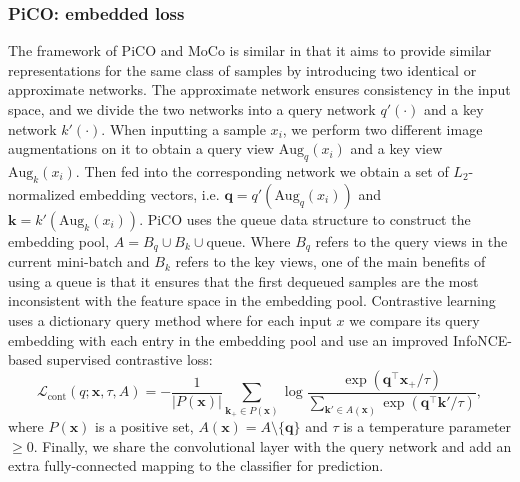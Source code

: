 \documentclass{article} %
\begin{document}
\subsubsection{PiCO: embedded loss}
The framework of PiCO and MoCo\citep{KaimingHe2019MomentumCF} is similar in that it aims to provide similar representations for the same class of samples by introducing two identical or approximate networks.
The approximate network ensures consistency in the input space, and we divide the two networks into a query network $q'(\cdot)$ and a key network $k'(\cdot)$.
When inputting a sample $x_i$, we perform two different image augmentations on it to obtain a query view $\text{Aug}_q(x_i)$ and a key view $\text{Aug}_k(x_i)$. 
Then fed into the corresponding network we obtain a set of $L_2$-normalized embedding vectors, i.e. $\boldsymbol{q} = q'(\text{Aug}_q(x_i))$ and $\boldsymbol{k} = k'(\text{Aug}_k(x_i))$.
PiCO uses the queue data structure to construct the embedding pool, $A = B_q \cup B_k \cup \text{queue}$.
Where $B_q$ refers to the query views in the current mini-batch and $B_k$ refers to the key views, one of the main benefits of using a queue is that it ensures that the first dequeued samples are the most inconsistent with the feature space in the embedding pool. 
Contrastive learning uses a dictionary query method where for each input $x$ we compare its query embedding with each entry in the embedding pool and use an improved InfoNCE-based supervised contrastive loss\citep{PrannayKhosla2020SupervisedCL, AaronvandenOord2018RepresentationLW}:
\begin{equation}
    \mathcal{L}_{\text{cont}}(q;\bm{x}, \tau, A) = -\frac{1}{|P(\boldsymbol{x})|} \sum_{\boldsymbol{k}_+\in P(\boldsymbol{x})}\log \frac{\exp(\boldsymbol{q}^\top\boldsymbol{x}_+ / \tau)}{\sum_{\boldsymbol{k}'\in A(\boldsymbol{x})}\exp(\boldsymbol{q}^\top \boldsymbol{k}' / \tau)},
\end{equation}
where $P(\boldsymbol{x})$ is a positive set, $A(\boldsymbol{x}) = A \setminus \{\boldsymbol{q}\}$ and $\tau$ is a temperature parameter $\ge 0$.
Finally, we share the convolutional layer with the query network and add an extra fully-connected mapping to the classifier for prediction. 
\end{document}
